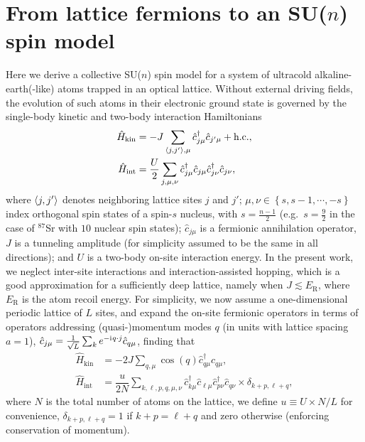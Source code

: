 \documentclass[aps,pra,nofootinbib,twocolumn,superscriptaddress]{revtex4-2}
\renewcommand{\t}{\text} %
\newcommand{\f}[2]{\dfrac{#1}{#2}} %
\newcommand{\p}[1]{\left(#1\right)} %
\renewcommand{\set}[1]{\left\{#1\right\}} %
\newcommand{\bk}{\braket} %
\renewcommand{\i}{\mathrm{i}\mkern1mu} %
\newcommand{\1}{\mathds{1}}
\renewcommand{\c}{\hat c}
\renewcommand{\H}{\hat H}
\begin{document}
\section{From lattice fermions to an SU($n$) spin model}
\label{sec:spin_model}

Here we derive a collective SU($n$) spin model for a system of ultracold alkaline-earth(-like) atoms trapped in an optical lattice.
Without external driving fields, the evolution of such atoms in their electronic ground state is governed by the single-body kinetic and two-body interaction Hamiltonians
\begin{align}
  \H_{\t{kin}}
  &= -J \sum_{\bk{j,j'},\mu} \c_{j\mu}^\dag \c_{j'\mu} + \t{h.c.},
  \label{eq:H_kin_FH} \\
  \H_{\t{int}}
  &= \f{U}{2} \sum_{j,\mu,\nu}
  \c_{j\mu}^\dag \c_{j\mu} \c_{j\nu}^\dag \c_{j\nu},
  \label{eq:H_int_FH}
\end{align}
where $\bk{j,j'}$ denotes neighboring lattice sites $j$ and $j'$; $\mu,\nu\in\set{s,s-1,\cdots,-s}$ index orthogonal spin states of a spin-$s$ nucleus, with $s=\frac{n-1}{2}$ (e.g.~$s=\frac{9}{2}$ in the case of ${}^{87}$Sr with $10$ nuclear spin states); $\c_{j\mu}$ is a fermionic annihilation operator, $J$ is a tunneling amplitude (for simplicity assumed to be the same in all directions); and $U$ is a two-body on-site interaction energy.
In the present work, we neglect inter-site interactions and interaction-assisted hopping, which is a good approximation for a sufficiently deep lattice, namely when $J\lesssim E_{\t{R}}$, where $E_{\t{R}}$ is the atom recoil energy.
For simplicity, we now assume a one-dimensional periodic lattice of $L$ sites, and expand the on-site fermionic operators in terms of operators addressing (quasi-)momentum modes $q$ (in units with lattice spacing $a=1$), $\c_{j\mu} = \frac1{\sqrt{L}} \sum_k e^{-\i q\cdot j} \c_{q\mu}$, finding that
\begin{align}
  \H_{\t{kin}}
  &= -2J\sum_{q,\mu} \cos\p{q} \c_{q\mu}^\dag \c_{q\mu}, \\
  \H_{\t{int}}
  &= \f{u}{2N} \sum_{k,\ell,p,q,\mu,\nu}
  \c_{k\mu}^\dag \c_{\ell\mu} \c_{p\nu}^\dag \c_{q\nu}
  \times \delta_{k+p,\ell+q},
  \label{eq:H_int_momenta}
\end{align}
where $N$ is the total number of atoms on the lattice, we define $u\equiv U\times N/L$ for convenience, $\delta_{k+p,\ell+q}=1$ if $k+p=\ell+q$ and zero otherwise (enforcing conservation of momentum).
\end{document}
